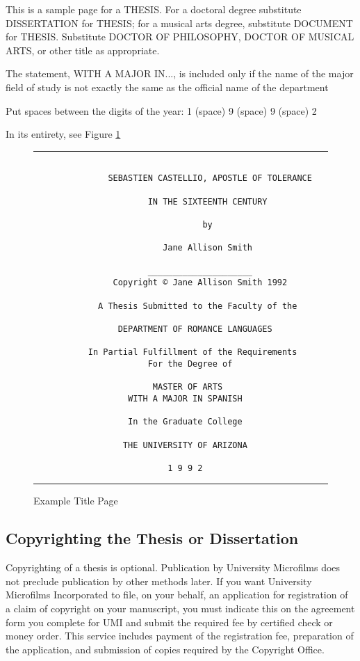 \documentclass[draft]{ua-thesis}
\begin{document}
This is a sample page for a THESIS. For a doctoral degree substitute
DISSERTATION for THESIS; for a musical arts degree, substitute DOCUMENT for
THESIS. Substitute DOCTOR OF PHILOSOPHY, DOCTOR OF MUSICAL ARTS, or other
title as appropriate.

The statement, WITH A MAJOR IN..., is included only if the name of the major
field of study is not exactly the same as the official name of the
department

Put spaces between the digits of the year: 1 (space) 9 (space) 9 (space) 2

In its entirety, see Figure \ref{f1}
\begin{figure}
\hrule
\begin{verbatim}

               SEBASTIEN CASTELLIO, APOSTLE OF TOLERANCE

                       IN THE SIXTEENTH CENTURY

                                  by

                          Jane Allison Smith

                       _____________________
                Copyright © Jane Allison Smith 1992

             A Thesis Submitted to the Faculty of the

                 DEPARTMENT OF ROMANCE LANGUAGES

           In Partial Fulfillment of the Requirements
                       For the Degree of

                        MASTER OF ARTS
                   WITH A MAJOR IN SPANISH

                   In the Graduate College

                  THE UNIVERSITY OF ARIZONA

                           1 9 9 2

\end{verbatim}
\hrule
\caption{Example Title Page}\label{f1}
\end{figure}


\subsection{Copyrighting the Thesis or Dissertation}

Copyrighting of a thesis is optional. Publication by University Microfilms
does not preclude publication by other methods later. If you want University
Microfilms Incorporated to file, on your behalf, an application for
registration of a claim of copyright on your manuscript, you must indicate
this on the agreement form you complete for UMI and submit the required fee
by certified check or money order. This service includes payment of the
registration fee, preparation of the application, and submission of copies
required by the Copyright Office.
\end{document}
